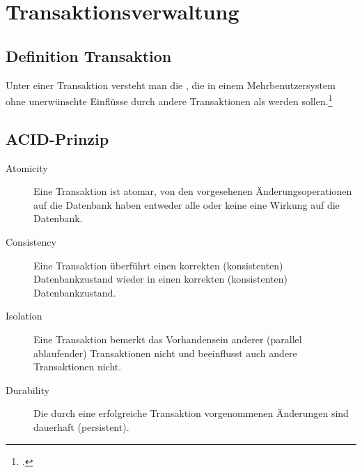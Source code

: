 \documentclass{lehramt-informatik-haupt}
\begin{document}
\chapter{Transaktionsverwaltung}

\section{Definition Transaktion}

Unter einer Transaktion versteht man die , die in einem Mehrbenutzersystem ohne unerwünschte
Einflüsse durch andere Transaktionen als  werden sollen.\footcite[Seite 1]{db:fs:5}

%

\section{ACID-Prinzip}

\begin{liQuellen}
\item \cite[Kapitel 9.5 „Eigenschaften von Transaktionen“, Seite 305]{kemper}
\item \cite[Seite 1]{db:fs:5}
\item \cite{wiki:acid}
\end{liQuellen}

\begin{description}
\item[Atomicity]

Eine Transaktion ist atomar, \dh von den vorgesehenen
Änderungsoperationen auf die Datenbank haben entweder alle oder keine
eine Wirkung auf die Datenbank.

\item[Consistency]

Eine Transaktion überführt einen korrekten (konsistenten)
Datenbankzustand wieder in einen korrekten (konsistenten)
Datenbankzustand.

\item[Isolation]

Eine Transaktion bemerkt das Vorhandensein anderer (parallel
ablaufender) Transaktionen nicht und beeinflusst auch andere
Transaktionen nicht.

\item[Durability]

Die durch eine erfolgreiche Transaktion vorgenommenen Änderungen sind
dauerhaft (persistent).
\end{description}
\end{document}
